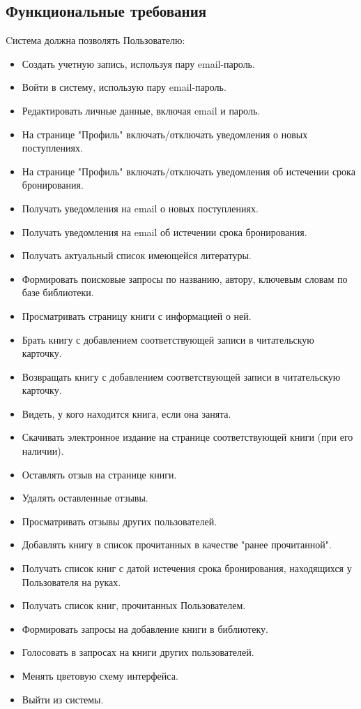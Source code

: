 \documentclass{subfiles}
\begin{document}
\subsection{Функциональные требования}
\par
Cистема должна позволять Пользователю:
\begin{itemize}
    \item Создать учетную запись, используя пару email-пароль.
    \item Войти в систему, использую пару email-пароль.
    \item Редактировать личные данные, включая email и пароль.
    \item На странице "Профиль" включать/отключать уведомления о новых поступлениях.
    \item На странице "Профиль" включать/отключать уведомления об истечении срока бронирования.
    \item Получать уведомления на email о новых поступлениях.
    \item Получать уведомления на email об истечении срока бронирования.
    \item Получать актуальный список имеющейся литературы.
    \item Формировать поисковые запросы по названию, автору, ключевым словам по базе библиотеки.
    \item Просматривать страницу книги с информацией о ней.
    \item Брать книгу с добавлением соответствующей записи в читательскую карточку.
    \item Возвращать книгу с добавлением соответствующей записи в читательскую карточку.
    \item Видеть, у кого находится книга, если она занята.
    \item Скачивать электронное издание на странице соответствующей книги (при его наличии).
    \item Оставлять отзыв на странице книги. 
    \item Удалять оставленные отзывы.
    \item Просматривать отзывы других пользователей.
    \item Добавлять книгу в список прочитанных в качестве "ранее прочитанной".
    \item Получать список книг с датой истечения срока бронирования, находящихся у Пользователя на руках.
    \item Получать список книг, прочитанных Пользователем. 
    \item Формировать запросы на добавление книги в библиотеку.
    \item Голосовать в запросах на книги других пользователей.
    \item Менять цветовую схему интерфейса.
    \item Выйти из системы.
\end{itemize}
\end{document}
